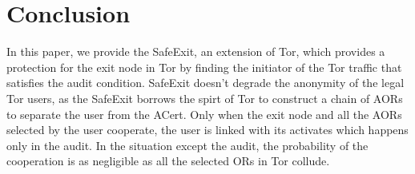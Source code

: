 \section{Conclusion}
\label{sec:conclusion}
In this paper, we provide the SafeExit, an extension of Tor, which provides a protection for the exit node in Tor by finding the initiator of the Tor traffic that satisfies the audit condition.
SafeExit doesn't degrade the anonymity of the legal Tor users, as the SafeExit borrows the spirt of Tor to construct a chain of AORs to separate the user from the ACert.
Only when the exit node and all the AORs selected by the user cooperate,
 the user is linked with its activates which happens only in the audit.
In the situation except the audit, the probability of the cooperation is as negligible as all the selected ORs in Tor collude.

